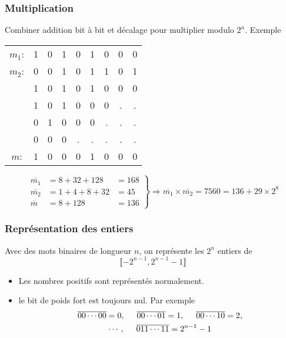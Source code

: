 \begin{frame}
  \frametitle{Multiplication}
Combiner addition bit à bit et décalage pour multiplier modulo $2^n$.\newline
Exemple
  \begin{center}
  \begin{tabular}{ccccccccc}
    $m_1$: & 1 & 0 & 1 & 0 & 1 & 0 & 0 & 0 \\
    $m_2$: & 0 & 0 & 1 & 0 & 1 & 1 & 0 & 1 \\ \hline 
           & 1 & 0 & 1 & 0 & 1 & 0 & 0 & 0 \\
           & 1 & 0 & 1 & 0 & 0 & 0 & . & .  \\
           & 0 & 1 & 0 & 0 & 0 & . & . & . \\
           & 0 & 0 & 0 & . & . & . & . & . \\ \hline
    $m$:   & 1 & 0 & 0 & 0 & 1 & 0 & 0 & 0
  \end{tabular}    
\end{center}
  
\begin{displaymath}
\left. 
\begin{aligned}
\overline{m_1} &= 8 + 32 + 128 &= 168 \\
\overline{m_2} &= 1 + 4 + 8 + 32 &= 45 \\
\overline{m} &=  8 + 128 &= 136
\end{aligned}
\right\rbrace \Rightarrow
\overline{m_1}\times \overline{m_2} = 7560 =136 + 29\times 2^8 
\end{displaymath}
\end{frame}

\begin{frame}
  \frametitle{Représentation des entiers}
Avec des mots binaires de longueur $n$, on représente les $2^n$ entiers de 
\begin{displaymath}
  \llbracket -2^{n-1}, 2^{n-1}-1 \rrbracket
\end{displaymath}
\begin{itemize}
  \item Les nombres positifs sont représentés normalement.
  \item le bit de poids fort est toujours nul. Par exemple
\begin{multline*}
  \overline{00\cdots00} = 0, \hspace{.5cm}\overline{00\cdots01} = 1, \hspace{.5cm}\overline{00\cdots10} = 2,\\
  \cdots,\hspace{.5cm}  \overline{011\cdots11} = 2^{n-1}-1
\end{multline*}
\end{itemize}
\end{frame}


